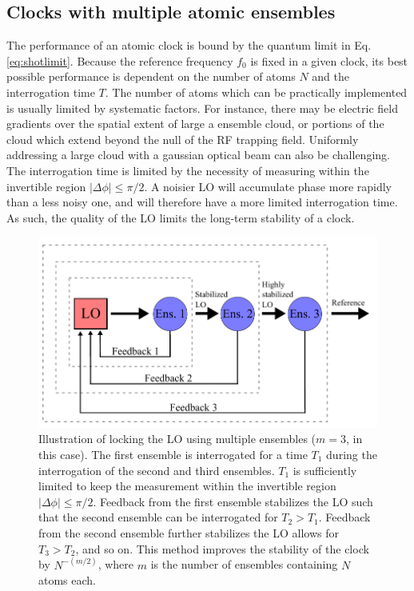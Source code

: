 \subsection{Clocks with multiple atomic ensembles}

The performance of an atomic clock is bound by the quantum limit in Eq. \ref{eq:shotlimit}. Because the reference frequency $f_0$ is fixed in a given clock, its best possible performance is dependent on the number of atoms $N$ and the interrogation time $T$. The number of atoms which can be practically implemented is usually limited by systematic factors. For instance, there may be electric field gradients over the spatial extent of large a ensemble cloud, or portions of the cloud which extend beyond the null of the RF trapping field. Uniformly addressing a large cloud with a gaussian optical beam can also be challenging. The interrogation time is limited by the necessity of measuring within the invertible region $|\Delta \phi| \leq \pi/2$. A noisier LO will accumulate phase more rapidly than a less noisy one, and will therefore have a more limited interrogation time. As such, the quality of the LO limits the long-term stability of a clock.

\begin{figure}[ht]
   \begin{center}
        \includegraphics{figures/5/Fig_multiensembles}
        \caption{\label{fig:multiensemble} Illustration of locking the LO using multiple ensembles ($m = 3$, in this case). The first ensemble is interrogated for a time $T_1$ during the interrogation of the second and third ensembles. $T_1$ is sufficiently limited to keep the measurement within the invertible region $|\Delta \phi| \leq \pi/2$. Feedback from the first ensemble stabilizes the LO such that the second ensemble can be interrogated for $T_2 > T_1$. Feedback from the second ensemble further stabilizes the LO allows for $T_3 > T_2$, and so on. This method improves the stability of the clock by $N^{-(m/2)}$, where $m$ is the number of ensembles containing $N$ atoms each. }
    \end{center}
\end{figure}


